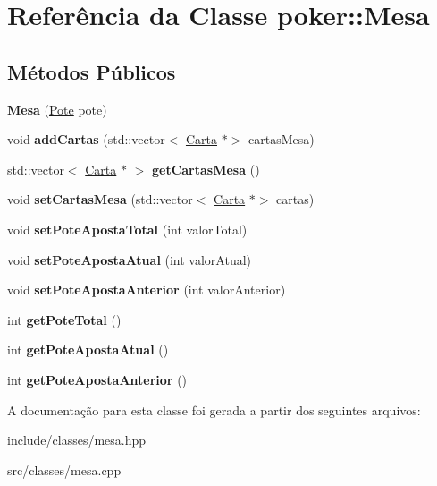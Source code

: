 \hypertarget{classpoker_1_1Mesa}{}\section{Referência da Classe poker\+:\+:Mesa}
\label{classpoker_1_1Mesa}
\subsection*{Métodos Públicos}
\begin{DoxyCompactItemize}
\item 
\mbox{\label{classpoker_1_1Mesa_aa3cd25e3d7aaddfaa2091763672f760f}} 
{\bfseries Mesa} (\hyperlink{classpoker_1_1Pote}{Pote} pote)
\item 
\mbox{\label{classpoker_1_1Mesa_a1d4b510163a50d2bb47596d6bf3bcec2}} 
void {\bfseries add\+Cartas} (std\+::vector$<$ \hyperlink{classpoker_1_1Carta}{Carta} $\ast$$>$ cartas\+Mesa)
\item 
\mbox{\label{classpoker_1_1Mesa_af8152c320c6a3eee9298e6cc5d98383f}} 
std\+::vector$<$ \hyperlink{classpoker_1_1Carta}{Carta} $\ast$ $>$ {\bfseries get\+Cartas\+Mesa} ()
\item 
\mbox{\label{classpoker_1_1Mesa_adb0cc51a4772afd12177f10c76a50e40}} 
void {\bfseries set\+Cartas\+Mesa} (std\+::vector$<$ \hyperlink{classpoker_1_1Carta}{Carta} $\ast$$>$ cartas)
\item 
\mbox{\label{classpoker_1_1Mesa_ae3a431a4ba3feaf4278fca2631c22383}} 
void {\bfseries set\+Pote\+Aposta\+Total} (int valor\+Total)
\item 
\mbox{\label{classpoker_1_1Mesa_abbcfb039d58a610c2c450651c018fac9}} 
void {\bfseries set\+Pote\+Aposta\+Atual} (int valor\+Atual)
\item 
\mbox{\label{classpoker_1_1Mesa_af88ab126b5e2553a94edd88dccdf75bb}} 
void {\bfseries set\+Pote\+Aposta\+Anterior} (int valor\+Anterior)
\item 
\mbox{\label{classpoker_1_1Mesa_aafc91610a1d2fbe7b7e85dc3151d3405}} 
int {\bfseries get\+Pote\+Total} ()
\item 
\mbox{\label{classpoker_1_1Mesa_a1b1f42aac7ab983abd9d5ca6a2638f88}} 
int {\bfseries get\+Pote\+Aposta\+Atual} ()
\item 
\mbox{\label{classpoker_1_1Mesa_af418c31eb5aecb3e1a0f2010ea3147e3}} 
int {\bfseries get\+Pote\+Aposta\+Anterior} ()
\end{DoxyCompactItemize}


A documentação para esta classe foi gerada a partir dos seguintes arquivos\+:\begin{DoxyCompactItemize}
\item 
include/classes/mesa.\+hpp\item 
src/classes/mesa.\+cpp\end{DoxyCompactItemize}
